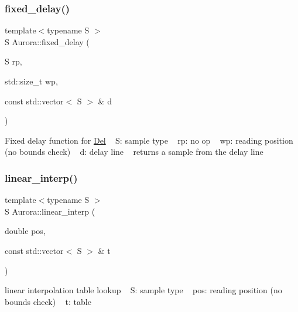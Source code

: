 \subsubsection{\texorpdfstring{fixed\+\_\+delay()}{fixed\_delay()}}
{\footnotesize\ttfamily template$<$typename S $>$ \\
S Aurora\+::fixed\+\_\+delay (\begin{DoxyParamCaption}\item[{S}]{rp,  }\item[{std\+::size\+\_\+t}]{wp,  }\item[{const std\+::vector$<$ S $>$ \&}]{d }\end{DoxyParamCaption})}

Fixed delay function for \hyperlink{class_aurora_1_1_del}{Del} ~\newline
S\+: sample type ~\newline
rp\+: no op ~\newline
wp\+: reading position (no bounds check) ~\newline
d\+: delay line ~\newline
returns a sample from the delay line \mbox{\label{namespace_aurora_acdc5f35b9cbf54f7fc84a423d76bd488}} 
\subsubsection{\texorpdfstring{linear\+\_\+interp()}{linear\_interp()}}
{\footnotesize\ttfamily template$<$typename S $>$ \\
S Aurora\+::linear\+\_\+interp (\begin{DoxyParamCaption}\item[{double}]{pos,  }\item[{const std\+::vector$<$ S $>$ \&}]{t }\end{DoxyParamCaption})}

linear interpolation table lookup ~\newline
S\+: sample type ~\newline
pos\+: reading position (no bounds check) ~\newline
t\+: table \mbox{\label{namespace_aurora_ade912bee8dbe0351b2193809ce592d8b}} 
